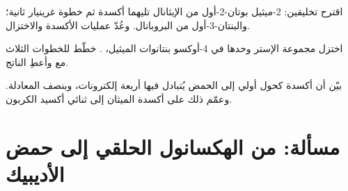 \begin{exercise}[$\star\star\star$]\label{exo:b1:organic-redox:10}
اقترح تخليقين: 2-ميثيل بوتان-2-أول من الإيثانال 
تليهما أكسدة ثم خطوة غرينيار ثانية؛ والبنتان-3-أول
من البروبانال. وعُدّ عمليات الأكسدة والاختزال.
\end{exercise}

\begin{exercise}[$\star\star\star$]\label{exo:b1:organic-redox:11}
اختزل مجموعة الإستر وحدها في 4-أوكسو بنتانوات الميثيل،
. خطّط للخطوات الثلاث مع  وأعطِ
الناتج.
\end{exercise}

\begin{exercise}[$\star\star\star$]\label{exo:b1:organic-redox:12}
بيّن أن أكسدة كحول أولي إلى الحمض يُتبادل فيها أربعة
إلكترونات،  وبنصف
المعادلة. وعمّم ذلك على أكسدة الميثان إلى ثنائي أكسيد الكربون.
\end{exercise}

\section{مسألة: من الهكسانول الحلقي إلى حمض الأديبيك}

